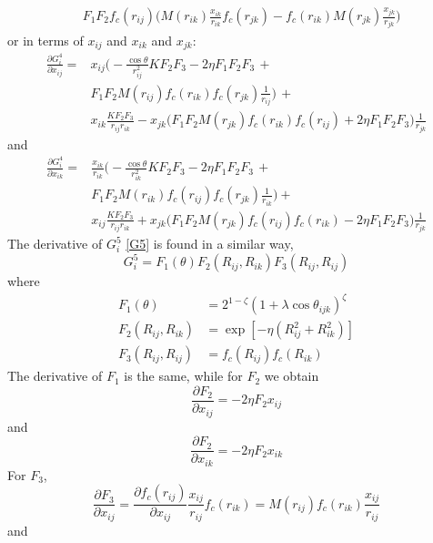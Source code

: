 \documentclass[twoside,english]{uiofysmaster}
\begin{document}
\begin{appendices}
\begin{align}
 &F_1F_2 f_c(r_{ij})\Biggr(M(r_{ik})\frac{x_{ik}}{r_{ik}}f_c(r_{jk}) - 
 f_c(r_{ik}) M(r_{jk})\frac{x_{jk}}{r_{jk}} \Biggr)
\end{align}
or in terms of $x_{ij}$ and $x_{ik}$ and $x_{jk}$:
\begin{align}
 \frac{\partial G_i^4}{\partial x_{ij}} = &x_{ij} \biggr(-\frac{\cos\theta}{r_{ij}^2}K
 F_2F_3 - 2\eta F_1F_2F_3 \, + \\ 
 &F_1F_2M(r_{ij})f_c(r_{ik})f_c(r_{jk})\frac{1}{r_{ij}}\biggr) \, + \\
 &x_{ik}\frac{KF_2F_3}{r_{ij}r_{ik}} - x_{jk}\Bigr(F_1F_2M(r_{jk})f_c(r_{ik})f_c(r_{ij}) + 2\eta F_1F_2F_3\Bigr)\frac{1}{r_{jk}}
\end{align}
and 
\begin{align}
 \frac{\partial G_i^4}{\partial x_{ik}} = &\frac{x_{ik}}{r_{ik}} \biggr(-\frac{\cos\theta}{r_{ik}^2}K
 F_2F_3 - 2\eta F_1F_2F_3 \, + \, \\
 &F_1F_2M(r_{ik})f_c(r_{ij})f_c(r_{jk})\frac{1}{r_{ik}}\biggr) + \, \\
 &x_{ij}\frac{KF_2F_3}{r_{ij}r_{ik}} + x_{jk}\Bigr(F_1F_2M(r_{jk})f_c(r_{ij})f_c(r_{ik}) - 2\eta F_1F_2F_3\Bigr)\frac{1}{r_{jk}}
\end{align}
The derivative of $G_i^5$ \eqref{G5} is found in a similar way,
\begin{equation}
 G_i^5 = F_1(\theta)F_2(R_{ij},R_{ik})F_3(R_{ij},R_{ij})
\end{equation}
where 
\begin{align}
 F_1(\theta) &= 2^{1-\zeta}(1 + \lambda \cos\theta_{ijk})^\zeta \\
 F_2(R_{ij},R_{ik}) &= \exp[-\eta (R_{ij}^2 + R_{ik}^2)] \\
 F_3(R_{ij},R_{ij}) &= f_c(R_{ij}) f_c(R_{ik})
\end{align}
The derivative of $F_1$ is the same, while for $F_2$ we obtain
\begin{equation}
 \frac{\partial F_2}{\partial x_{ij}} = -2\eta F_2 x_{ij}
\end{equation}
and
\begin{equation}
 \frac{\partial F_2}{\partial x_{ik}} = -2\eta F_2 x_{ik}
\end{equation}
For $F_3$, 
\begin{equation}
 \frac{\partial F_3}{\partial x_{ij}} = \frac{\partial f_c(r_{ij})}{\partial x_{ij}}\frac{x_{ij}}{r_{ij}}
 f_c(r_{ik}) = M(r_{ij})f_c(r_{ik})\frac{x_{ij}}{r_{ij}}
\end{equation}
and
\begin{equation}

\end{equation}
\end{appendices}
\end{document}

